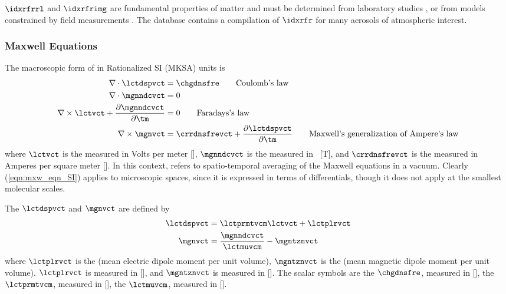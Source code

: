 \documentclass[12pt]{article}
\begin{document}
$\idxrfrrl$ and $\idxrfrimg$ are fundamental properties of matter and
must be determined from laboratory studies
\cite[e.g.,][]{HKS98,PGS77,Pat81,PeG91,Tan97,Vol73,BoH83},
or from models constrained by field measurements 
\cite[e.g.,][]{CTT02,STD03}.
The  database \cite[]{RRG98} contains a compilation of
$\idxrfr$ for many aerosols of atmospheric interest.

\subsubsection[Maxwell Equations]{Maxwell Equations}\label{sxn:mxw_eqn}
The macroscopic form of  in Rationalized
SI (MKSA) units is \cite[][p.~12]{BoH83}
\begin{subequations}
\label{eqn:mxw_eqn_SI}
\begin{align}
\label{eqn:mxw_eqn_SI_clb}
\nabla \cdot \lctdspvct & = \chgdnsfre \qquad\mbox{Coulomb's law} \\
\label{eqn:mxw_eqn_SI_mgn_ndc}
\nabla \cdot \mgnndcvct & = 0 \\
\label{eqn:mxw_eqn_SI_frd}
\nabla \times \lctvct + \frac{\partial \mgnndcvct}{\partial \tm} & = 0 \qquad\mbox{Faradays's law} \\
\label{eqn:mxw_eqn_SI_amp}
\nabla \times \mgnvct & = \crrdnsfrevct + \frac{\partial \lctdspvct}{\partial \tm} \qquad\mbox{Maxwell's generalization of Ampere's law}
\end{align}
\end{subequations} 
where $\lctvct$ is the  measured in Volts per
meter [\vxm], $\mgnndcvct$ is the 
measured in ~[T], and $\crrdnsfrevct$ is the
 measured in Amperes per square meter
[\axmS].
In this context,  refers to spatio-temporal
averaging of the Maxwell equations in a vacuum. 
Clearly (\ref{eqn:mxw_eqn_SI}) applies to microscopic spaces, since 
it is expressed in terms of differentials, though it does not apply
at the smallest molecular scales.

The  $\lctdspvct$ and  $\mgnvct$ are defined by
\begin{subequations}
\label{eqn:dsp_mgn_eqn}
\begin{align}
\label{eqn:lct_dsp_dfn}
\lctdspvct & = \lctprmtvcm \lctvct + \lctplrvct \\
\label{eqn:mgn_dfn}
\mgnvct & = \frac{\mgnndcvct}{\lctmuvcm} - \mgntznvct
\end{align}
\end{subequations} 
where $\lctplrvct$ is the 
(mean electric dipole moment per unit volume), $\mgntznvct$ is the
 (mean magnetic dipole moment per unit volume).
$\lctplrvct$ is measured in [\cxmS], and $\mgntznvct$ is measured in
[\axm]. 
The scalar symbols are 
the  $\chgdnsfre$, measured in [\cxmC], 
the  $\lctprmtvcm$, measured in [\fxm], 
the  $\lctmuvcm$, measured in [\hxm]. 
\end{document}
